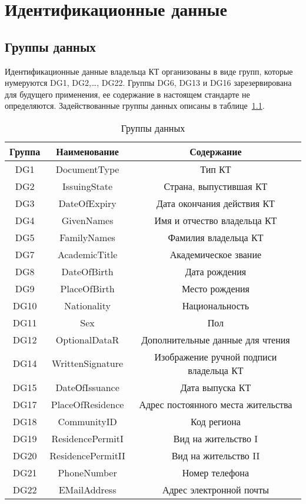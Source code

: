 \chapter{Идентификационные данные}\label{DATA}

\section{Группы данных}\label{DATA.DG}

Идентификационные данные владельца КТ организованы в виде групп, 
которые нумеруются DG1, DG2,\ldots, DG22. 
Группы DG6, DG13 и DG16 зарезервирована для будущего 
применения, ее содержание в настоящем стандарте не определяются. 
Задействованные группы данных описаны в таблице~\ref{Table.DATA.DG}. 

\begin{table}[h!]
\caption{Группы данных}\label{Table.DATA.DG}
\begin{tabular}{|c|c|c|}
\hline
Группа & Наименование & Содержание \\
\hline
\hline
DG1 &	DocumentType &	Тип КТ    \\
\hline
DG2 &	IssuingState &	Страна, выпустившая КТ \\
\hline
DG3 &	DateOfExpiry &	Дата окончания действия КТ  \\
\hline
DG4 &	GivenNames   &	Имя и отчество владельца КТ  \\
\hline
DG5 &	FamilyNames &	Фамилия владельца КТ  \\
\hline
DG7 &	AcademicTitle & Академическое звание  \\
\hline
DG8 &	DateOfBirth &	Дата рождения    \\
\hline
DG9 &	PlaceOfBirth &	Место рождения  \\
\hline
DG10 & 	Nationality &	Национальность \\
\hline
DG11 &	Sex 	  &  Пол \\
\hline
DG12 &	OptionalDataR & Дополнительные данные для чтения \\
\hline
DG14 &  WrittenSignature & Изображение ручной подписи владельца КТ \\
\hline
DG15 &  DateОfIssuance & Дата выпуска КТ \\
\hline
DG17 &	PlaceOfResidence &	Адрес постоянного места жительства  \\
\hline
DG18 &	CommunityID 	 &   Код региона \\
\hline
DG19 &	ResidencePermitI &	Вид на жительство I  \\
\hline
DG20 &	ResidencePermitII& 	Вид на жительство II \\
\hline
DG21 &	PhoneNumber & Номер телефона \\
\hline
DG22 &	EMailAddress & Адрес электронной почты \\
\hline
\end{tabular}
\end{table}
                         
